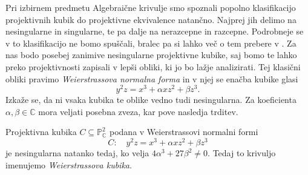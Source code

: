 \documentclass[mat1]{fmfdelo}
\numberwithin{equation}{section}
\newcommand{\C}{\mathbb C}
\newcommand{\PC}{\mathbb{P}^2_\C}
\theoremstyle{definition}
\begin{document}
Pri izbirnem predmetu Algebraične krivulje smo spoznali popolno klasifikacijo projektivnih kubik do projektivne ekvivalence natančno. Najprej jih delimo na nesingularne in singularne, te pa dalje na nerazcepne in razcepne. Podrobneje se v to klasifikacijo ne bomo spuščali, bralec pa si lahko več o tem prebere v \cite[poglavje 15]{Gibson}.
Za nas bodo posebej zanimive nesingularne projektivne kubike, saj bomo te lahko preko projektivnosti zapisali v lepši obliki, ki jo bo lažje analizirati. Tej klasični obliki pravimo \emph{Weierstrassova normalna forma} in v njej se enačba kubike glasi 
\begin{equation}
    \label{klasicna wnf}
    y^2z = x^3 + \alpha xz^2 + \beta z^3. 
\end{equation}
Izkaže se, da ni vsaka kubika te oblike vedno tudi nesingularna. Za koeficienta $\alpha, \beta \in \C$ mora veljati posebna zveza, kar pove nasledja trditev.

\begin{trditev}
    \label{kriterij za singularnost wnf}
    Projektivna kubika $C \subseteq \PC$ podana v Weierstrassovi normalni formi
    \[
        C: \quad y^2z = x^3 + \alpha xz^2 + \beta z^3
    \]
    je nesingularna natanko tedaj, ko velja $4\alpha^3 + 27\beta^2 \neq 0$. Tedaj to krivuljo imenujemo \emph{Weierstrassova kubika}. 

\end{trditev}
\end{document}
